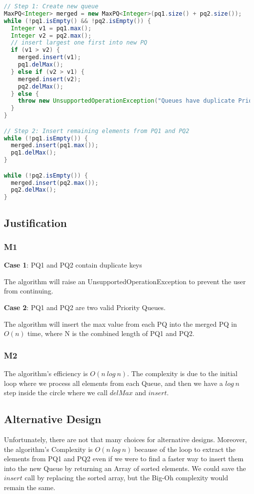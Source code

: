 \documentclass{article}
\begin{document}
\begin{lstlisting}[language=Java,caption={Code for solution to retrieve max intensities},label=designsolution3,captionpos=b,frame=single]
// Step 1: Create new queue
MaxPQ<Integer> merged = new MaxPQ<Integer>(pq1.size() + pq2.size());
while (!pq1.isEmpty() && !pq2.isEmpty()) {
  Integer v1 = pq1.max();
  Integer v2 = pq2.max();
  // insert largest one first into new PQ
  if (v1 > v2) {
    merged.insert(v1);
    pq1.delMax();
  } else if (v2 > v1) {
    merged.insert(v2);
    pq2.delMax();
  } else {
    throw new UnsupportedOperationException("Queues have duplicate Priority");
  }
}

// Step 2: Insert remaining elements from PQ1 and PQ2
while (!pq1.isEmpty()) {
  merged.insert(pq1.max());
  pq1.delMax();
}

while (!pq2.isEmpty()) {
  merged.insert(pq2.max());
  pq2.delMax();
}
\end{lstlisting}

\subsection{Justification}

\subsubsection{M1}

\textbf{Case 1}: PQ1 and PQ2 contain duplicate keys

The algorithm will raise an UnsupportedOperationException to prevent the user from continuing.

\textbf{Case 2}: PQ1 and PQ2 are two valid Priority Queues.

The algorithm will insert the max value from each PQ into the merged PQ in $O(n)$ time, where N is the combined length of PQ1 and PQ2.

\subsubsection{M2}

The algorithm's efficiency is $O(n~log~n)$. The complexity is due to the initial loop where we process all elements from each Queue, and then we have a $log~n$ step inside the circle where we call $delMax$ and $insert$. 

\subsection{Alternative Design}

Unfortunately, there are not that many choices for alternative designs. Moreover, the algorithm's Complexity is $O(n~log~n)$ because of the loop to extract the elements from PQ1 and PQ2 even if we were to find a faster way to insert them into the new Queue by returning an Array of sorted elements. We could save the $insert$ call by replacing the sorted array, but the Big-Oh complexity would remain the same.



\end{document}
